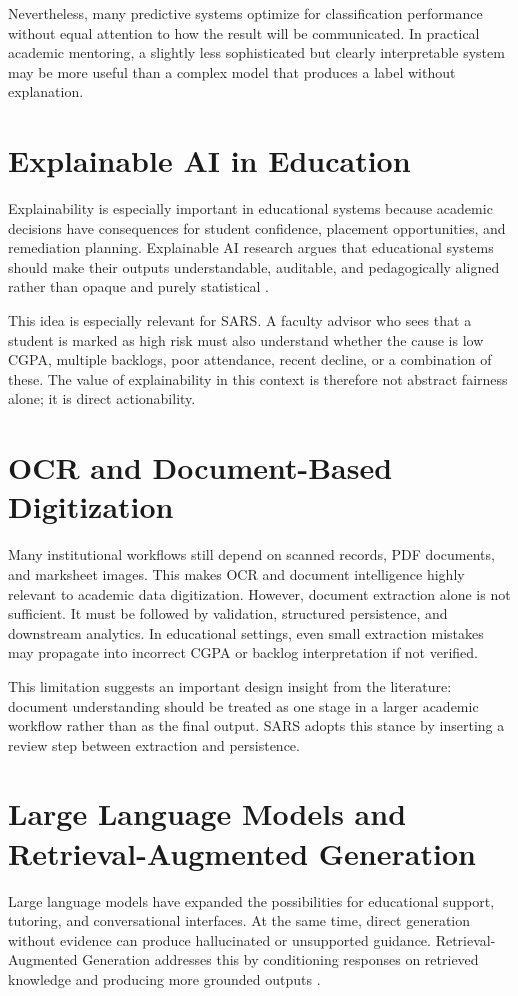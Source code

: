 Nevertheless, many predictive systems optimize for classification performance without equal attention to how the result will be communicated. In practical academic mentoring, a slightly less sophisticated but clearly interpretable system may be more useful than a complex model that produces a label without explanation.

\section{Explainable AI in Education}
Explainability is especially important in educational systems because academic decisions have consequences for student confidence, placement opportunities, and remediation planning. Explainable AI research argues that educational systems should make their outputs understandable, auditable, and pedagogically aligned rather than opaque and purely statistical \cite{khosravi2022xai}.

This idea is especially relevant for SARS. A faculty advisor who sees that a student is marked as high risk must also understand whether the cause is low CGPA, multiple backlogs, poor attendance, recent decline, or a combination of these. The value of explainability in this context is therefore not abstract fairness alone; it is direct actionability.

\section{OCR and Document-Based Digitization}
Many institutional workflows still depend on scanned records, PDF documents, and marksheet images. This makes OCR and document intelligence highly relevant to academic data digitization. However, document extraction alone is not sufficient. It must be followed by validation, structured persistence, and downstream analytics. In educational settings, even small extraction mistakes may propagate into incorrect CGPA or backlog interpretation if not verified.

This limitation suggests an important design insight from the literature: document understanding should be treated as one stage in a larger academic workflow rather than as the final output. SARS adopts this stance by inserting a review step between extraction and persistence.

\section{Large Language Models and Retrieval-Augmented Generation}
Large language models have expanded the possibilities for educational support, tutoring, and conversational interfaces. At the same time, direct generation without evidence can produce hallucinated or unsupported guidance. Retrieval-Augmented Generation addresses this by conditioning responses on retrieved knowledge and producing more grounded outputs \cite{kasneci2023chatgpt,lewis2020rag,gao2023rag}.

